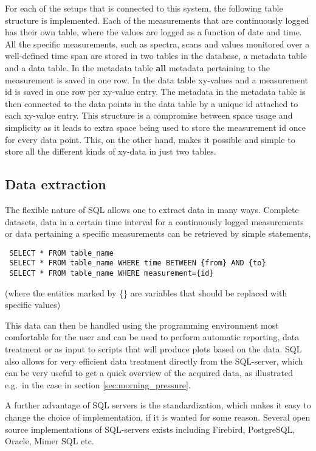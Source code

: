 For each of the setups that is connected to this system, the following table
structure is implemented. Each of the measurements that are continuously logged
has their own table, where the values are logged as a function of date and
time. All the specific measurements, such as spectra, scans and values
monitored over a well-defined time span are stored in two tables in the
database, a metadata table and a data table. In the metadata table \textbf{all}
metadata pertaining to the measurement is saved in one row. In the data table
xy-values and a measurement id is saved in one row per xy-value entry. The
metadata in the metadata table is then connected to the data points in the data
table by a unique id attached to each xy-value entry. This structure is a
compromise between space usage and simplicity as it leads to extra space being
used to store the measurement id once for every data point. This, on the other
hand, makes it possible and simple to store all the different kinds of xy-data
in just two tables.

\subsection{Data extraction} \label{sec:data_extraction}

The flexible nature of SQL allows one to extract data in many ways. Complete
datasets, data in a certain time interval for a continuously logged
measurements or data pertaining a specific measurements can be retrieved by
simple statements, 
\begin{verbatim}
 SELECT * FROM table_name
 SELECT * FROM table_name WHERE time BETWEEN {from} AND {to}
 SELECT * FROM table_name WHERE measurement={id}
\end{verbatim}
(where the entities marked by \{\} are variables that should be
replaced with specific values)

This data can then be handled using the programming environment most
comfortable for the user and can be used to perform automatic reporting, data
treatment or as input to scripts that will produce plots based on the data. SQL
also allows for very efficient data treatment directly from the SQL-server,
which can be very useful to get a quick overview of the acquired data, as
illustrated e.g.\ in the case in section \ref{sec:morning_pressure}.

A further advantage of SQL servers is the standardization, which makes it easy
to change the choice of implementation, if it is wanted for some reason.
Several open source implementations of SQL-servers exists including Firebird,
PostgreSQL, Oracle, Mimer SQL etc.
